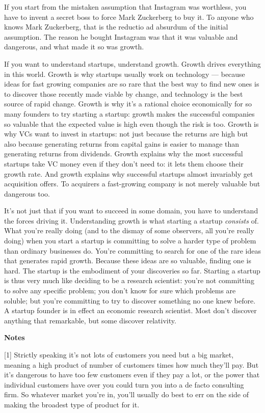 If you start from the mistaken assumption that Instagram was worthless,
you have to invent a secret boss to force Mark Zuckerberg to buy it. To
anyone who knows Mark Zuckerberg, that is the reductio ad absurdum of
the initial assumption. The reason he bought Instagram was that it was
valuable and dangerous, and what made it so was growth.

If you want to understand startups, understand growth. Growth drives
everything in this world. Growth is why startups usually work on
technology --- because ideas for fast growing companies are so rare that
the best way to find new ones is to discover those recently made viable
by change, and technology is the best source of rapid change. Growth is
why it's a rational choice economically for so many founders to try
starting a startup: growth makes the successful companies so valuable
that the expected value is high even though the risk is too. Growth is
why VCs want to invest in startups: not just because the returns are
high but also because generating returns from capital gains is easier to
manage than generating returns from dividends. Growth explains why the
most successful startups take VC money even if they don't need to: it
lets them choose their growth rate. And growth explains why successful
startups almost invariably get acquisition offers. To acquirers a
fast-growing company is not merely valuable but dangerous too.

It's not just that if you want to succeed in some domain, you have to
understand the forces driving it. Understanding growth is what starting
a startup \emph{consists} of. What you're really doing (and to the
dismay of some observers, all you're really doing) when you start a
startup is committing to solve a harder type of problem than ordinary
businesses do. You're committing to search for one of the rare ideas
that generates rapid growth. Because these ideas are so valuable,
finding one is hard. The startup is the embodiment of your discoveries
so far. Starting a startup is thus very much like deciding to be a
research scientist: you're not committing to solve any specific problem;
you don't know for sure which problems are soluble; but you're
committing to try to discover something no one knew before. A startup
founder is in effect an economic research scientist. Most don't discover
anything that remarkable, but some discover relativity.

\textbf{Notes}

{[}1{]} Strictly speaking it's not lots of customers you need but a big
market, meaning a high product of number of customers times how much
they'll pay. But it's dangerous to have too few customers even if they
pay a lot, or the power that individual customers have over you could
turn you into a de facto consulting firm. So whatever market you're in,
you'll usually do best to err on the side of making the broadest type of
product for it.

